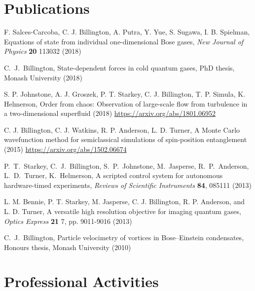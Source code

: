 \documentclass[10pt,letterpaper]{article}
\renewenvironment{itemize}{
  \begin{list}{}{
    \setlength{\leftmargin}{1.5em}
    \setlength{\itemsep}{0.25em}
    \setlength{\parskip}{0pt}
    \setlength{\parsep}{0.25em}
  }
}{
  \end{list}
}
\begin{document}
\section*{Publications}

\begin{itemize}

\item F. Salces-Carcoba, C. J. Billington, A. Putra, Y. Yue, S. Sugawa, I. B. Spielman, Equations of state from individual one-dimensional Bose gases, \textit{New Journal of Physics} {\bf 20} 113032 (2018) 

\item C.~J.~Billington, State-dependent forces in cold quantum gases, PhD thesis, Monash University (2018) 

\item S. P. Johnstone, A. J. Groszek, P. T. Starkey, C. J. Billington, T. P. Simula, K. Helmerson, Order from chaos: Observation of large-scale flow from turbulence in a two-dimensional superfluid (2018) \url{https://arxiv.org/abs/1801.06952}

\item C. J. Billington, C. J. Watkins, R. P. Anderson, L. D. Turner, A Monte Carlo wavefunction method for semiclassical simulations of spin-position entanglement (2015) \url{https://arxiv.org/abs/1502.06674}

\item P.~T.~Starkey, C.~J.~Billington, S.~P.~Johnstone, M.~Jasperse, R.~P.~Anderson, L.~D.~Turner, K.~Helmerson, A scripted control system for autonomous hardware-timed experiments, \textit{Reviews of Scientific Instruments} {\bf 84}, 085111 (2013) 

\item L. M. Bennie, P. T. Starkey, M. Jasperse, C. J. Billington, R. P. Anderson, and L. D. Turner, A versatile high resolution objective for imaging quantum gases, \textit{Optics Express} {\bf 21} 7, pp. 9011-9016 (2013) 

\item C.~J.~Billington, Particle velocimetry of vortices in Bose--Einstein condensates, Honours thesis, Monash University (2010) 

    
\end{itemize}

\section*{Professional Activities}
\end{document}
